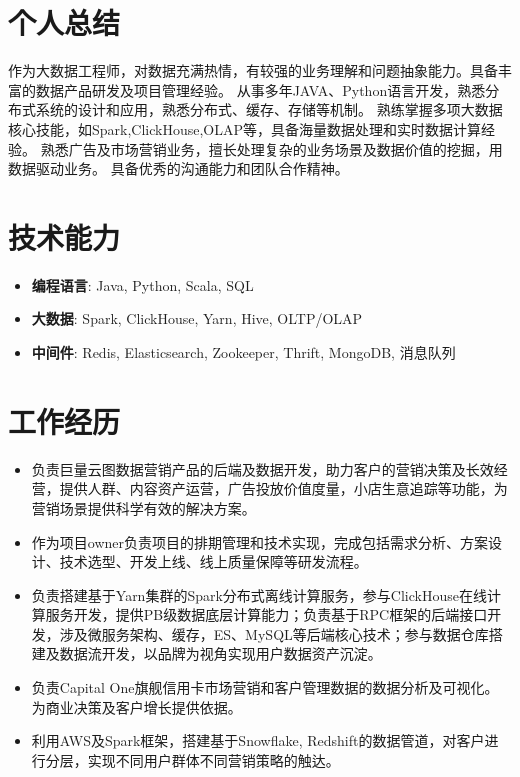 \documentclass{resume}
\begin{document}

 
\section{个人总结}
作为大数据工程师，对数据充满热情，有较强的业务理解和问题抽象能力。具备丰富的数据产品研发及项目管理经验。
从事多年JAVA、Python语言开发，熟悉分布式系统的设计和应用，熟悉分布式、缓存、存储等机制。
熟练掌握多项大数据核心技能，如Spark,ClickHouse,OLAP等，具备海量数据处理和实时数据计算经验。
熟悉广告及市场营销业务，擅长处理复杂的业务场景及数据价值的挖掘，用数据驱动业务。
具备优秀的沟通能力和团队合作精神。

\section{技术能力}
\begin{itemize}[parsep=0.2ex]
  \item \textbf{编程语言}: Java, Python, Scala, SQL
  \item \textbf{大数据}: Spark, ClickHouse, Yarn, Hive, OLTP/OLAP
  \item \textbf{中间件}: Redis, Elasticsearch, Zookeeper, Thrift, MongoDB, 消息队列
\end{itemize}

\section{工作经历}
\begin{itemize}
  \item 负责巨量云图数据营销产品的后端及数据开发，助力客户的营销决策及长效经营，提供人群、内容资产运营，广告投放价值度量，小店生意追踪等功能，为营销场景提供科学有效的解决方案。
  \item 作为项目owner负责项目的排期管理和技术实现，完成包括需求分析、方案设计、技术选型、开发上线、线上质量保障等研发流程。
  \item 负责搭建基于Yarn集群的Spark分布式离线计算服务，参与ClickHouse在线计算服务开发，提供PB级数据底层计算能力；负责基于RPC框架的后端接口开发，涉及微服务架构、缓存，ES、MySQL等后端核心技术；参与数据仓库搭建及数据流开发，以品牌为视角实现用户数据资产沉淀。
\end{itemize}

\begin{itemize}
  \item 负责Capital One旗舰信用卡市场营销和客户管理数据的数据分析及可视化。为商业决策及客户增长提供依据。
  \item 利用AWS及Spark框架，搭建基于Snowflake, Redshift的数据管道，对客户进行分层，实现不同用户群体不同营销策略的触达。
\end{itemize}
\end{document}
